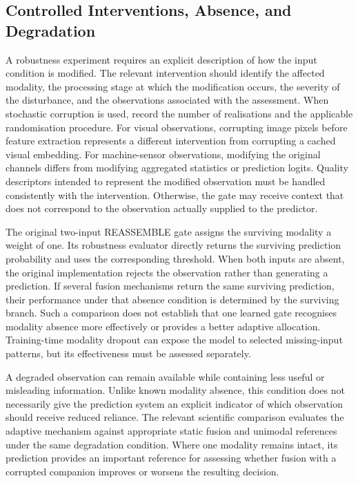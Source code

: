 \subsection{Controlled Interventions, Absence, and Degradation}

A robustness experiment requires an explicit description of how the input condition is modified. The relevant intervention should identify the affected modality, the processing stage at which the modification occurs, the severity of the disturbance, and the observations associated with the assessment. When stochastic corruption is used, record the number of realisations and the applicable randomisation procedure. For visual observations, corrupting image pixels before feature extraction represents a different intervention from corrupting a cached visual embedding. For machine-sensor observations, modifying the original channels differs from modifying aggregated statistics or prediction logits. Quality descriptors intended to represent the modified observation must be handled consistently with the intervention. Otherwise, the gate may receive context that does not correspond to the observation actually supplied to the predictor.

The original two-input REASSEMBLE gate assigns the surviving modality a weight of one. Its robustness evaluator directly returns the surviving prediction probability and uses the corresponding threshold. When both inputs are absent, the original implementation rejects the observation rather than generating a prediction. If several fusion mechanisms return the same surviving prediction, their performance under that absence condition is determined by the surviving branch. Such a comparison does not establish that one learned gate recognises modality absence more effectively or provides a better adaptive allocation. Training-time modality dropout can expose the model to selected missing-input patterns, but its effectiveness must be assessed separately.

A degraded observation can remain available while containing less useful or misleading information. Unlike known modality absence, this condition does not necessarily give the prediction system an explicit indicator of which observation should receive reduced reliance. The relevant scientific comparison evaluates the adaptive mechanism against appropriate static fusion and unimodal references under the same degradation condition. Where one modality remains intact, its prediction provides an important reference for assessing whether fusion with a corrupted companion improves or worsens the resulting decision.

